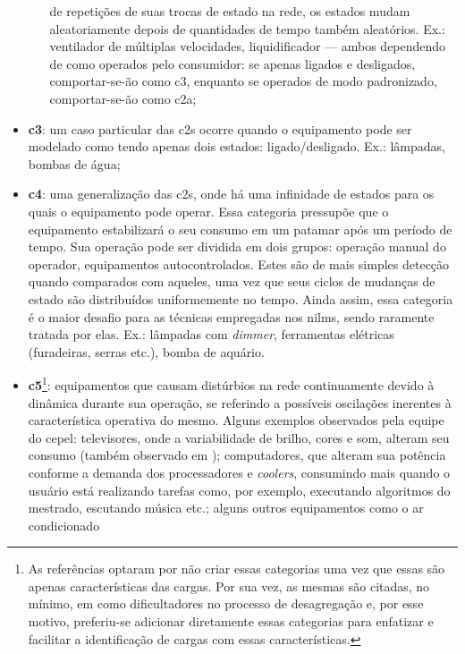 \begin{itemize}
\begin{itemize}
de repetições de suas trocas de estado na rede, os estados mudam
aleatoriamente depois de quantidades de tempo também aleatórios. Ex.:
ventilador de múltiplas velocidades, liquidificador --- ambos
dependendo de como operados pelo consumidor: se apenas ligados e
desligados, comportar-se-ão como \acs{c3}, enquanto se
operados de modo padronizado, comportar-se-ão como \acs{c2a};
\end{itemize}
\item \textbf{\gls{c3}}: um caso particular das \glspl{c2} ocorre
quando o equipamento pode ser modelado como tendo apenas dois estados:
ligado/desligado. Ex.: lâmpadas, bombas de água;
\item \textbf{\Gls{c4}}: uma generalização das \glspl{c2}, onde
há uma infinidade de estados para os quais o equipamento pode operar.
Essa categoria pressupõe que o equipamento estabilizará o seu consumo
em um patamar após um período de tempo. Sua operação pode ser dividida
em dois grupos: operação manual do operador, equipamentos
autocontrolados. Estes são de mais simples detecção quando comparados
com aqueles, uma vez que seus ciclos de mudanças de estado são
distribuídos uniformemente no tempo. Ainda assim, essa categoria é o
maior desafio para as técnicas empregadas nos \glspl{nilm}, sendo
raramente tratada por elas. Ex.: lâmpadas com \emph{dimmer},
ferramentas elétricas (furadeiras, serras etc.), bomba de aquário.
\item \textbf{\Gls{c5}}\footnote{As referências optaram por não
criar essas categorias uma vez que essas são apenas
características das cargas. Por sua vez, as mesmas são citadas, no
mínimo, em \cite{nilm_zeifman_review_2011,nilm_liang_pt2_2010_40}
como dificultadores no processo de desagregação e, por esse motivo,
preferiu-se adicionar diretamente essas categorias para
enfatizar e facilitar a identificação de cargas com essas
características.\label{fn:categoria_add}}: equipamentos que causam
distúrbios na rede continuamente devido à dinâmica durante sua
operação, se referindo a possíveis oscilações inerentes à
característica operativa do mesmo. Alguns exemplos observados pela
equipe do \gls{cepel}: televisores, onde a variabilidade de brilho,
cores e som, alteram seu consumo (também observado em
\cite{nilm_zeifman_statistical_naive_enduses_2013}); computadores, que
alteram sua potência conforme a demanda dos processadores e
\emph{coolers}, consumindo mais quando o usuário está realizando
tarefas como, por exemplo, executando algoritmos do mestrado,
escutando música etc.; alguns outros equipamentos como o ar condicionado

\end{itemize}
